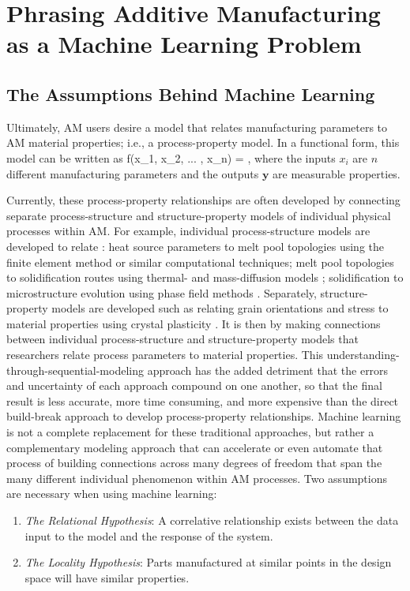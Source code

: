 \section{Phrasing Additive Manufacturing as a Machine Learning Problem}\label{phrasing}

\subsection{The Assumptions Behind Machine Learning}
Ultimately, AM users desire a model that relates manufacturing parameters to AM material properties; i.e., a process-property model. In a functional form, this model can be written as
\eqn
f(x_1, x_2, ... , x_n) = ,
\label{fundamentalgoal}
\equ
where the inputs $x_i$ are $n$ different manufacturing parameters and the outputs $\mathbf{y}$ are measurable properties.

Currently, these process-property relationships are often developed by connecting separate process-structure and structure-property models of individual physical processes within AM.
For example, individual process-structure models are developed to relate : heat source parameters to melt pool topologies \cite{Khairallah2016} using the finite element method or similar computational techniques; melt pool topologies to solidification routes using thermal- and mass-diffusion models  \cite{Tan2011}; solidification to microstructure evolution using phase field methods \cite{Kundin2015}.
Separately, structure-property models are developed such as relating grain orientations and stress to material properties using crystal plasticity \cite{Pal2014}.
It is then by making connections between individual process-structure and structure-property models that researchers relate process parameters to material properties.
This understanding-through-sequential-modeling approach has the added detriment that the errors and uncertainty of each approach compound on one another, so that the final result is less accurate, more time consuming, and more expensive than the direct build-break approach to develop process-property relationships.
Machine learning is not a complete replacement for these traditional approaches, but rather a complementary modeling approach that can accelerate or even automate that process of building connections across many degrees of freedom that span the many different individual phenomenon within AM processes.
Two assumptions are necessary when using machine learning:
\begin{enumerate}
\item \textit{The Relational Hypothesis}: A correlative relationship exists between the data input to the model and the response of the system.
\item \textit{The Locality Hypothesis}: Parts manufactured at similar points in the design space will have similar properties.
\end{enumerate}

